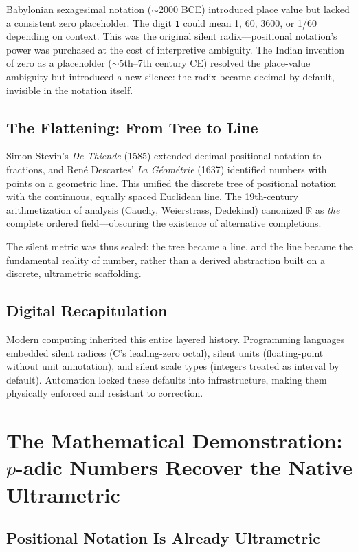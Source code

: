 \documentclass[12pt,a4paper]{article}
\theoremstyle{definition}
\theoremstyle{remark}
\begin{document}
Babylonian sexagesimal notation ($\sim$2000 BCE) introduced place value but lacked a consistent zero placeholder. The digit \texttt{1} could mean 1, 60, 3600, or 1/60 depending on context. This was the original silent radix---positional notation's power was purchased at the cost of interpretive ambiguity. The Indian invention of zero as a placeholder ($\sim$5th--7th century CE) resolved the place-value ambiguity but introduced a new silence: the radix became decimal by default, invisible in the notation itself.

\subsection{The Flattening: From Tree to Line}

Simon Stevin's \emph{De Thiende} (1585) extended decimal positional notation to fractions, and Ren\'e Descartes' \emph{La G\'eom\'etrie} (1637) identified numbers with points on a geometric line. This unified the discrete tree of positional notation with the continuous, equally spaced Euclidean line. The 19th-century arithmetization of analysis (Cauchy, Weierstrass, Dedekind) canonized $\mathbb{R}$ as \emph{the} complete ordered field---obscuring the existence of alternative completions.

The silent metric was thus sealed: the tree became a line, and the line became the fundamental reality of number, rather than a derived abstraction built on a discrete, ultrametric scaffolding.

\subsection{Digital Recapitulation}

Modern computing inherited this entire layered history. Programming languages embedded silent radices (C's leading-zero octal), silent units (floating-point without unit annotation), and silent scale types (integers treated as interval by default). Automation locked these defaults into infrastructure, making them physically enforced and resistant to correction.

\section{The Mathematical Demonstration: $p$-adic Numbers Recover the Native Ultrametric}

\subsection{Positional Notation Is Already Ultrametric}
\end{document}

